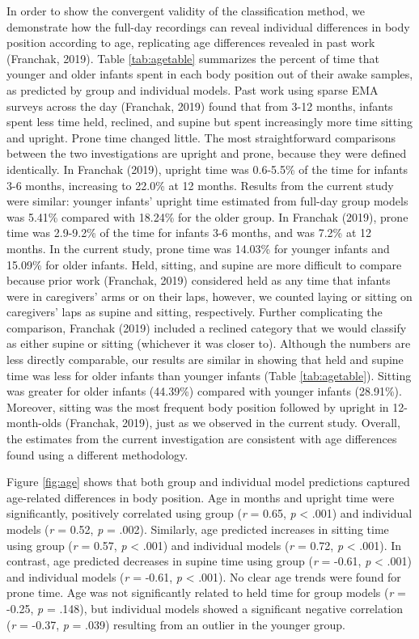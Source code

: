 \documentclass[
  man]{apa6}
\begin{document}
In order to show the convergent validity of the classification method, we demonstrate how the full-day recordings can reveal individual differences in body position according to age, replicating age differences revealed in past work (Franchak, 2019). Table \ref{tab:agetable} summarizes the percent of time that younger and older infants spent in each body position out of their awake samples, as predicted by group and individual models. Past work using sparse EMA surveys across the day (Franchak, 2019) found that from 3-12 months, infants spent less time held, reclined, and supine but spent increasingly more time sitting and upright. Prone time changed little. The most straightforward comparisons between the two investigations are upright and prone, because they were defined identically. In Franchak (2019), upright time was 0.6-5.5\% of the time for infants 3-6 months, increasing to 22.0\% at 12 months. Results from the current study were similar: younger infants' upright time estimated from full-day group models was 5.41\% compared with 18.24\% for the older group. In Franchak (2019), prone time was 2.9-9.2\% of the time for infants 3-6 months, and was 7.2\% at 12 months. In the current study, prone time was 14.03\% for younger infants and 15.09\% for older infants. Held, sitting, and supine are more difficult to compare because prior work (Franchak, 2019) considered held as any time that infants were in caregivers' arms or on their laps, however, we counted laying or sitting on caregivers' laps as supine and sitting, respectively. Further complicating the comparison, Franchak (2019) included a reclined category that we would classify as either supine or sitting (whichever it was closer to). Although the numbers are less directly comparable, our results are similar in showing that held and supine time was less for older infants than younger infants (Table \ref{tab:agetable}). Sitting was greater for older infants (44.39\%) compared with younger infants (28.91\%). Moreover, sitting was the most frequent body position followed by upright in 12-month-olds (Franchak, 2019), just as we observed in the current study. Overall, the estimates from the current investigation are consistent with age differences found using a different methodology.

Figure \ref{fig:age} shows that both group and individual model predictions captured age-related differences in body position. Age in months and upright time were significantly, positively correlated using group (\emph{r} = 0.65, \emph{p} \textless{} .001) and individual models (\emph{r} = 0.52, \emph{p} = .002). Similarly, age predicted increases in sitting time using group (\emph{r} = 0.57, \emph{p} \textless{} .001) and individual models (\emph{r} = 0.72, \emph{p} \textless{} .001). In contrast, age predicted decreases in supine time using group (\emph{r} = -0.61, \emph{p} \textless{} .001) and individual models (\emph{r} = -0.61, \emph{p} \textless{} .001). No clear age trends were found for prone time. Age was not significantly related to held time for group models (\emph{r} = -0.25, \emph{p} = .148), but individual models showed a significant negative correlation (\emph{r} = -0.37, \emph{p} = .039) resulting from an outlier in the younger group.
\end{document}

